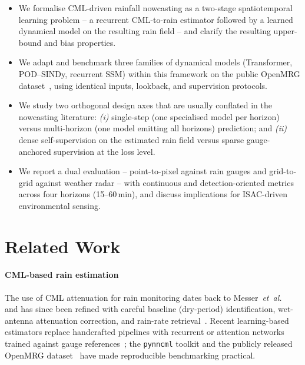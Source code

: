 \documentclass[conference]{IEEEtran}
\begin{document}
\begin{itemize}
  \item We formalise CML-driven rainfall nowcasting as a two-stage
        spatiotemporal learning problem -- a recurrent CML-to-rain
        estimator followed by a learned dynamical model on the resulting
        rain field -- and clarify the resulting upper-bound and bias
        properties.
  \item We adapt and benchmark three families of dynamical models
        (Transformer, POD--SINDy, recurrent SSM) within this framework
        on the public OpenMRG dataset~\cite{andersson2022openmrg}, using
        identical inputs, lookback, and supervision protocols.
  \item We study two orthogonal design axes that are usually conflated
        in the nowcasting literature: \emph{(i)} single-step (one
        specialised model per horizon) versus multi-horizon
        (one model emitting all horizons) prediction; and \emph{(ii)}
        dense self-supervision on the estimated rain field versus sparse
        gauge-anchored supervision at the loss level.
  \item We report a dual evaluation -- point-to-pixel against rain
        gauges and grid-to-grid against weather radar -- with
        continuous and detection-oriented metrics across four horizons
        (15--60\,min), and discuss implications for ISAC-driven
        environmental sensing.
\end{itemize}

\section{Related Work}
\label{sec:related}

\paragraph*{CML-based rain estimation}
The use of CML attenuation for rain monitoring dates back to
Messer~\emph{et~al.}~\cite{messer2006} and has since been refined with
careful baseline (dry-period) identification, wet-antenna attenuation
correction, and rain-rate retrieval~\cite{overeem2013,chwala2019}.
Recent learning-based estimators replace handcrafted pipelines with
recurrent or attention networks trained against gauge
references~\cite{habi2020,pynncml}; the \texttt{pynncml} toolkit and the
publicly released OpenMRG dataset~\cite{andersson2022openmrg} have made
reproducible benchmarking practical.
\end{document}

